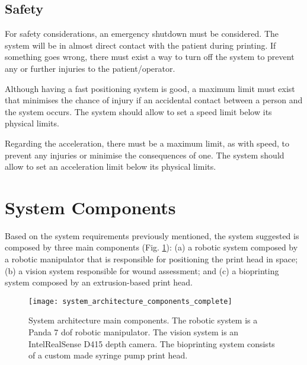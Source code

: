 \subsection{Safety}
\label{subsec:system_architecture_requirements_safety}

For safety considerations, an emergency shutdown must be considered. The system will be in almost direct contact with the patient during printing. If something goes wrong, there must exist a way to turn off the system to prevent any or further injuries to the patient/operator.

Although having a fast positioning system is good, a maximum limit must exist that minimises the chance of injury if an accidental contact between a person and the system occurs. The system should allow to set a speed limit below its physical limits.

Regarding the acceleration, there must be a maximum limit, as with speed, to prevent any injuries or minimise the consequences of one. The system should allow to set an acceleration limit below its physical limits.




\section{System Components}
\label{sec:system_architecture_components}

Based on the system requirements previously mentioned, the system suggested is composed by three main components (Fig. \ref{fig:system_architecture_components}): (a) a robotic system composed by a robotic manipulator that is responsible for positioning the print head in space; (b) a vision system responsible for wound assessment; and (c) a bioprinting system composed by an extrusion-based print head.

\begin{figure}[htbp]
	\centering
	\texttt{[image: system\_architecture\_components\_complete]}
	\caption[System architecture main components.]{System architecture main components. The robotic system is a Panda 7 \gls{dof} robotic manipulator. The vision system is an Intel\textregistered RealSense\texttrademark{} D415 depth camera. The bioprinting system consists of a custom made syringe pump print head.}
	\label{fig:system_architecture_components}
\end{figure}


